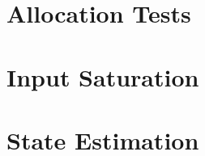 \section{Allocation Tests}
\label{sec:simulation.allocator}

\section{Input Saturation}
\label{sec:simulation.saturation}

\section{State Estimation}
\label{sec:simulation.state}

